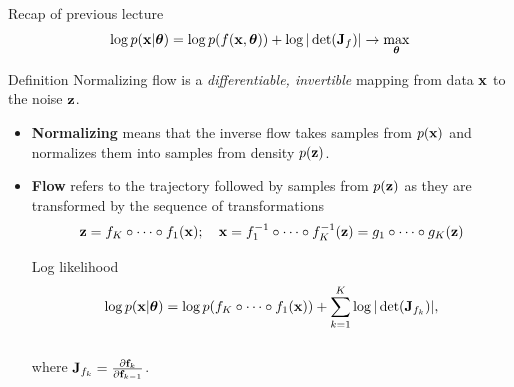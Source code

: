 \begin{frame}{Recap of previous lecture}
	\[
		\log p(\mathbf{x}|\boldsymbol{\theta}) = \log p(f(\mathbf{x}, \boldsymbol{\theta})) + \log  |\det (\mathbf{J}_f) | \rightarrow \max_{\boldsymbol{\theta}}
	\]
	\vspace{-0.3cm}
	\begin{block}{Definition}
		Normalizing flow is a \textit{differentiable, invertible} mapping from data $\mathbf{x}$ to the noise $\mathbf{z}$. 
	\end{block}
	\begin{itemize}
		\item \textbf{Normalizing} means that the inverse flow takes samples from $p(\mathbf{x})$ and normalizes them into samples from density $p(\mathbf{z})$.
		\item \textbf{Flow} refers to the trajectory followed by samples from $p(\mathbf{z})$ as they are transformed by the sequence of transformations
		\[
			\mathbf{z} = f_K \circ \dots \circ f_1(\mathbf{x}); \quad \mathbf{x} = f_1^{-1} \circ \dots \circ f_K^{-1} (\mathbf{z}) = g_1 \circ \dots \circ g_K(\mathbf{z}) 
		\] 
		\vspace{-0.4cm}
		\begin{block}{Log likelihood}
			\vspace{-0.4cm}
			\[
				\log p(\mathbf{x} | \boldsymbol{\theta}) = \log p(f_K \circ \dots \circ f_1(\mathbf{x})) + \sum_{k=1}^K\log |\det (\mathbf{J}_{f_k})|,
			\]
			\vspace{-0.4cm} \\
			where $\mathbf{J}_{f_k} = \frac{\partial \mathbf{f}_k}{\partial \mathbf{f}_{k-1}}$.
		\end{block}
	\end{itemize}
\end{frame}
